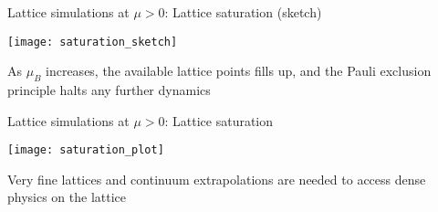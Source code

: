 \begin{frame}{Lattice simulations at \texorpdfstring{$\mu > 0$}{m > 0}: Lattice saturation (sketch)}

  \begin{center}
    \texttt{[image: saturation\_sketch]}
  \end{center}

  \vspace{-.2cm}

  As $\mu_B$ increases, the available lattice points fills up, and the
  \alert{Pauli exclusion principle} halts any further dynamics
  
\end{frame}

\begin{frame}{Lattice simulations at \texorpdfstring{$\mu > 0$}{m > 0}: Lattice saturation}

  \begin{center}
    \texttt{[image: saturation\_plot]}
  \end{center}

  \vspace{-.2cm}

  Very \alert{fine lattices} and \alert{continuum extrapolations} are needed to
  access dense physics on the lattice

  
\end{frame}
